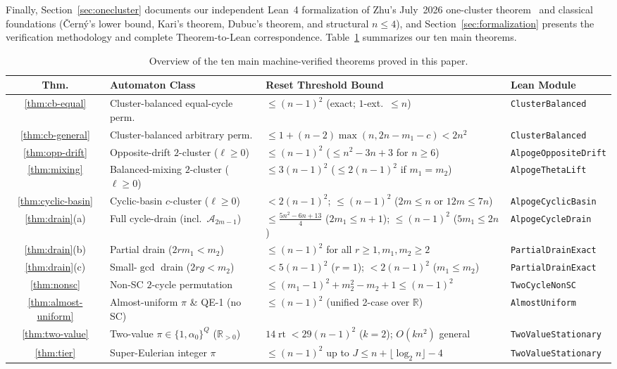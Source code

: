 \documentclass[11pt,a4paper]{article}
\theoremstyle{definition}
\theoremstyle{remark}
\newcommand{\rt}{\operatorname{rt}}
\newcommand{\R}{\mathbb{R}}
\newcommand{\cA}{\mathcal{A}}
\begin{document}
Finally, Section~\ref{sec:onecluster} documents our independent Lean~4 formalization of Zhu's July~2026 one-cluster theorem~\cite{Zhu2026} and classical foundations (\v{C}ern\'y's lower bound, Kari's theorem, Dubuc's theorem, and structural $n \le 4$), and Section~\ref{sec:formalization} presents the verification methodology and complete Theorem-to-Lean correspondence. Table~\ref{tab:summary} summarizes our ten main theorems.

\begin{table}[t]
\centering
\footnotesize
\renewcommand{\arraystretch}{1.18}
\begin{tabular}{@{}c>{\raggedright\arraybackslash}p{4.3cm}>{\raggedright\arraybackslash}p{5.8cm}>{\raggedright\arraybackslash}p{3.4cm}@{}}
\toprule
\textbf{Thm.} & \textbf{Automaton Class} & \textbf{Reset Threshold Bound} & \textbf{Lean Module} \\
\midrule
\ref{thm:cb-equal} & Cluster-balanced equal-cycle perm. & $\le (n-1)^2$ (exact; $1$-ext.\ $\le n$) & \texttt{ClusterBalanced} \\
\ref{thm:cb-general} & Cluster-balanced arbitrary perm. & $\le 1+(n-2)\max(n,2n-m_1-c) < 2n^2$ & \texttt{ClusterBalanced} \\
\ref{thm:opp-drift} & Opposite-drift $2$-cluster ($\ell \ge 0$) & $\le (n-1)^2$ ($\le n^2-3n+3$ for $n\ge 6$) & \texttt{AlpogeOppositeDrift} \\
\ref{thm:mixing} & Balanced-mixing $2$-cluster ($\ell \ge 0$) & $\le 3(n-1)^2$ ($\le 2(n-1)^2$ if $m_1=m_2$) & \texttt{AlpogeThetaLift} \\
\ref{thm:cyclic-basin} & Cyclic-basin $c$-cluster ($\ell \ge 0$) & $<2(n-1)^2$; $\le (n-1)^2$ ($2m\le n$ or $12m\le 7n$) & \texttt{AlpogeCyclicBasin} \\
\ref{thm:drain}(a) & Full cycle-drain (incl.\ $\cA_{2m-1}$) & $\le \frac{5n^2-6n+13}{4}$ ($2m_1\le n+1$); $\le (n-1)^2$ ($5m_1\le 2n$) & \texttt{AlpogeCycleDrain} \\
\ref{thm:drain}(b) & Partial drain ($2rm_1 < m_2$) & $\le (n-1)^2$ for all $r\ge 1, m_1,m_2\ge 2$ & \texttt{PartialDrainExact} \\
\ref{thm:drain}(c) & Small-$\gcd$ drain ($2rg < m_2$) & $< 5(n-1)^2$ ($r=1$); $<2(n-1)^2$ ($m_1\le m_2$) & \texttt{PartialDrainExact} \\
\ref{thm:nonsc} & Non-SC $2$-cycle permutation & $\le (m_1-1)^2 + m_2^2 - m_2 + 1 \le (n-1)^2$ & \texttt{TwoCycleNonSC} \\
\ref{thm:almost-uniform} & Almost-uniform $\pi$ \& QE-1 (no SC) & $\le (n-1)^2$ (unified 2-case over $\R$) & \texttt{AlmostUniform} \\
\ref{thm:two-value} & Two-value $\pi \in \{1,\alpha_0\}^Q$ ($\R_{>0}$) & $14\rt < 29(n-1)^2$ ($k=2$); $O(kn^2)$ general & \texttt{TwoValueStationary} \\
\ref{thm:tier} & Super-Eulerian integer $\pi$ & $\le (n-1)^2$ up to $J \le n+\lfloor\log_2 n\rfloor - 4$ & \texttt{TwoValueStationary} \\
\bottomrule
\end{tabular}
\caption{Overview of the ten main machine-verified theorems proved in this paper.}
\label{tab:summary}
\end{table}
\end{document}
